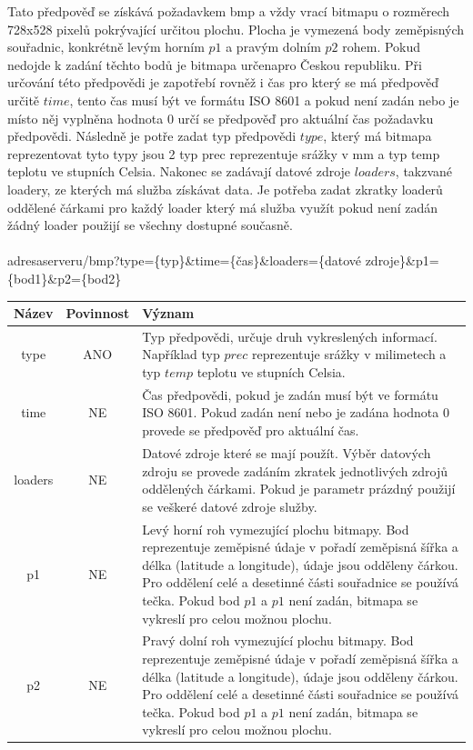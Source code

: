\documentclass[czech,bachelor,dept460,male,csharp,cpdeclaration]{diploma}
\begin{document}
	Tato předpověď se získává požadavkem bmp a vždy vrací bitmapu o rozměrech 728x528 pixelů pokrývající určitou plochu. Plocha je vymezená body zeměpisných souřadnic, konkrétně levým horním $p1$ a pravým dolním $p2$ rohem. Pokud nedojde k zadání těchto bodů je bitmapa určenapro Českou republiku. Při určování této předpovědi je zapotřebí rovněž i čas pro který se má předpověď určitě $time$, tento čas musí být ve formátu ISO 8601 a pokud není zadán nebo je místo něj vyplněna hodnota 0 určí se předpověď pro aktuální čas požadavku předpovědi. Následně je potře zadat typ předpovědi $type$, který má bitmapa reprezentovat tyto typy jsou 2 typ prec reprezentuje srážky v mm a typ temp teplotu ve stupních Celsia. Nakonec se zadávají datové zdroje $loaders$, takzvané loadery, ze kterých má služba získávat data. Je potřeba zadat zkratky loaderů oddělené čárkami pro každý loader který má služba využít pokud není zadán žádný loader použijí se všechny dostupné současně.
	\\\\
	adresaserveru/bmp?type=\{typ\}\&time=\{čas\}\&loaders=\{datové zdroje\}\&p1=\{bod1\}\&p2=\{bod2\}
	
	\begin{center}
		\begin{tabular}{c c p{13cm}}
			Název & Povinnost & Význam \\
			\midrule
			type & ANO & Typ předpovědi, určuje druh vykreslených informací. Například typ $prec$ reprezentuje srážky v milimetech a typ $temp$ teplotu ve stupních Celsia.\\ 
   			time & NE & Čas předpovědi, pokud je zadán musí být ve formátu ISO 8601. Pokud zadán není nebo je zadána hodnota 0  provede se předpověď pro aktuální čas.\\ 
   			loaders & NE & Datové zdroje které se mají použít. Výběr datových zdroju se provede zadáním zkratek jednotlivých zdrojů oddělených čárkami. Pokud je parametr prázdný použijí se veškeré datové zdroje služby. \\ 
   			p1 & NE & Levý horní roh vymezující plochu bitmapy. Bod reprezentuje zeměpisné údaje v pořadí zeměpisná šířka a délka (latitude a longitude), údaje jsou odděleny čárkou. Pro oddělení celé a desetinné části souřadnice se používá tečka. Pokud bod $p1$ a $p1$ není zadán, bitmapa se vykreslí pro celou možnou plochu.\\
   			p2 & NE & Pravý dolní roh vymezující plochu bitmapy. Bod reprezentuje zeměpisné údaje v pořadí zeměpisná šířka a délka (latitude a longitude), údaje jsou odděleny čárkou. Pro oddělení celé a desetinné části souřadnice se používá tečka. Pokud bod $p1$ a $p1$ není zadán, bitmapa se vykreslí pro celou možnou plochu.\\
		\end{tabular}
	\end{center}
	
\end{document}
